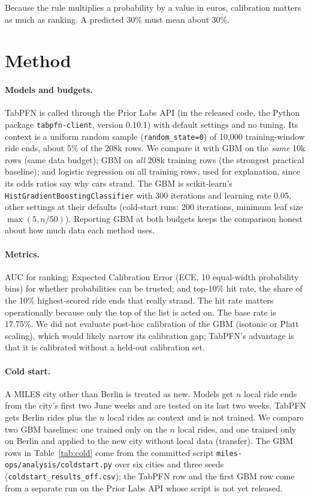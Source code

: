 \documentclass[11pt,a4paper]{article}
\begin{document}
Because the rule multiplies a probability by a value in euros, calibration matters as much as ranking. A predicted 30\% must mean about 30\%.

\section{Method}\label{sec:method}

\paragraph{Models and budgets.} TabPFN is called through the Prior Labs API (in the released code, the Python package \texttt{tabpfn-client}, version 0.10.1) with default settings and no tuning. Its context is a uniform random sample (\texttt{random\_state=0}) of 10,000 training-window ride ends, about 5\% of the 208k rows. We compare it with GBM on the \emph{same} 10k rows (same data budget); GBM on \emph{all} 208k training rows (the strongest practical baseline); and logistic regression on all training rows, used for explanation, since its odds ratios say why cars strand. The GBM is scikit-learn's \texttt{HistGradient\-Boosting\-Classifier} with 300 iterations and learning rate 0.05, other settings at their defaults (cold-start runs: 200 iterations, minimum leaf size $\max(5, n/50)$). Reporting GBM at both budgets keeps the comparison honest about how much data each method uses.

\paragraph{Metrics.} AUC for ranking; Expected Calibration Error (ECE, 10 equal-width probability bins) for whether probabilities can be trusted; and top-10\% hit rate, the share of the 10\% highest-scored ride ends that really strand. The hit rate matters operationally because only the top of the list is acted on. The base rate is 17.75\%. We did not evaluate post-hoc calibration of the GBM (isotonic or Platt scaling), which would likely narrow its calibration gap; TabPFN's advantage is that it is calibrated without a held-out calibration set.

\paragraph{Cold start.} A MILES city other than Berlin is treated as new. Models get $n$ local ride ends from the city's first two June weeks and are tested on its last two weeks. TabPFN gets Berlin rides plus the $n$ local rides as context and is not trained. We compare two GBM baselines: one trained only on the $n$ local rides, and one trained only on Berlin and applied to the new city without local data (transfer). The GBM rows in Table~\ref{tab:cold} come from the committed script \texttt{miles-ops/analysis/coldstart.py} over six cities and three seeds (\texttt{coldstart\_results\_off.csv}); the TabPFN row and the first GBM row come from a separate run on the Prior Labs API whose script is not yet released.
\end{document}
